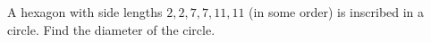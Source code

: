 A hexagon with side lengths $2,2,7,7,11,11$ (in some order) is inscribed in a circle. Find the diameter of the circle.

